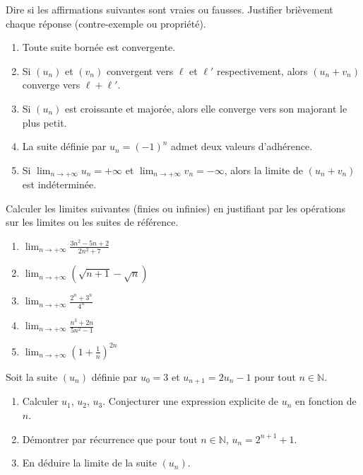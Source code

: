 \documentclass[11pt]{article}
\begin{document}
\begin{exercice}
Dire si les affirmations suivantes sont vraies ou fausses. Justifier brièvement chaque réponse (contre-exemple ou propriété).
\begin{enumerate}
    \item Toute suite bornée est convergente.
    \item Si $(u_n)$ et $(v_n)$ convergent vers $\ell$ et $\ell'$ respectivement, alors $(u_n + v_n)$ converge vers $\ell + \ell'$.
    \item Si $(u_n)$ est croissante et majorée, alors elle converge vers son majorant le plus petit.
    \item La suite définie par $u_n = (-1)^n$ admet deux valeurs d'adhérence.
    \item Si $\lim_{n\to +\infty} u_n = +\infty$ et $\lim_{n\to +\infty} v_n = -\infty$, alors la limite de $(u_n + v_n)$ est indéterminée.
\end{enumerate}
\end{exercice}

\begin{exercice}
Calculer les limites suivantes (finies ou infinies) en justifiant par les opérations sur les limites ou les suites de référence.
\begin{enumerate}
    \item $\displaystyle \lim_{n\to +\infty} \frac{3n^2 - 5n + 2}{2n^2 + 7}$
    \item $\displaystyle \lim_{n\to +\infty} \left( \sqrt{n+1} - \sqrt{n} \right)$
    \item $\displaystyle \lim_{n\to +\infty} \frac{2^n + 3^n}{4^n}$
    \item $\displaystyle \lim_{n\to +\infty} \frac{n^3 + 2n}{5n^2 - 1}$
    \item $\displaystyle \lim_{n\to +\infty} \left(1 + \frac{1}{n}\right)^{2n}$
\end{enumerate}
\end{exercice}

\begin{exercice}
Soit la suite $(u_n)$ définie par $u_0 = 3$ et $u_{n+1} = 2u_n - 1$ pour tout $n \in \mathbb{N}$.
\begin{enumerate}
    \item Calculer $u_1$, $u_2$, $u_3$. Conjecturer une expression explicite de $u_n$ en fonction de $n$.
    \item Démontrer par récurrence que pour tout $n \in \mathbb{N}$, $u_n = 2^{n+1} + 1$.
    \item En déduire la limite de la suite $(u_n)$.
\end{enumerate}
\end{exercice}
\end{document}
